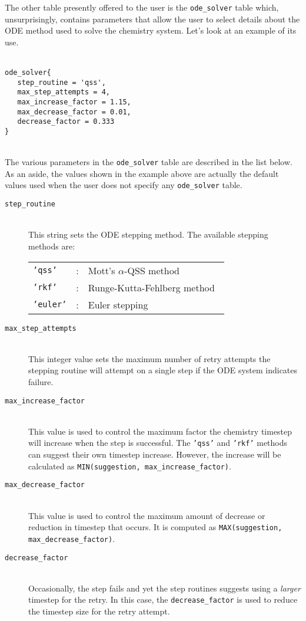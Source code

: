 The other table presently offered to the user is the \texttt{ode\_solver} table which,
unsurprisingly, contains parameters that allow the user to select details
about the ODE method used to solve the chemistry system.
Let's look at an example of its use.\\
%
\topbar\\
\begin{verbatim}
ode_solver{
   step_routine = 'qss',
   max_step_attempts = 4,
   max_increase_factor = 1.15,
   max_decrease_factor = 0.01,
   decrease_factor = 0.333
}
\end{verbatim}
\bottombar\\
%
The various parameters in the \texttt{ode\_solver} table are described
in the list below.
As an aside, the values shown in the example above are actually the default
values used when the user does not specify any \texttt{ode\_solver} table.
\begin{description}
\item[\texttt{step\_routine}] \hspace{1cm} \\
   This string sets the ODE stepping method. The available stepping methods are: \\
   \begin{tabular}{lll}
    \texttt{'qss'} & : & Mott's $\alpha$-QSS method~\cite{mott_99a} \\
    \texttt{'rkf'} & : & Runge-Kutta-Fehlberg method~\cite{fehlberg_69a} \\
    \texttt{'euler'} & : & Euler stepping \\
   \end{tabular}
\item[\texttt{max\_step\_attempts}] \hspace{1cm} \\
    This integer value sets the maximum number of retry attempts the stepping
    routine will attempt on a single step if the ODE system indicates failure.
\item[\texttt{max\_increase\_factor}] \hspace{1cm} \\
    This value is used to control the maximum factor the chemistry timestep
    will increase when the step is successful.  The \texttt{'qss'} and \texttt{'rkf'}
    methods can suggest their own timestep increase. However, the increase will
    be calculated as \texttt{MIN(suggestion, max\_increase\_factor)}.
\item[\texttt{max\_decrease\_factor}] \hspace{1cm} \\
    This value is used to control the maximum amount of decrease or reduction
    in timestep that occurs.  It is computed as \texttt{MAX(suggestion, max\_decrease\_factor)}.
\item[\texttt{decrease\_factor}] \hspace{1cm} \\
    Occasionally, the step fails and yet the step routines suggests using a \emph{larger}
    timestep for the retry.  In this case, the \texttt{decrease\_factor} is used to reduce
    the timestep size for the retry attempt.
\end{description}



